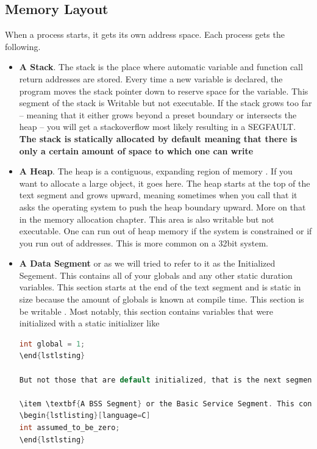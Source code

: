\subsection{Memory Layout}

When a process starts, it gets its own address space. Each process gets the following.

\begin{itemize}
\item \textbf{A Stack}.
The stack is the place where automatic variable and function call return addresses are stored.
Every time a new variable is declared, the program moves the stack pointer down to reserve space for the variable.
This segment of the stack is Writable but not executable.
If the stack grows too far -- meaning that it either grows beyond a preset boundary or intersects the heap -- you will get a stackoverflow most likely resulting in a SEGFAULT.
\textbf{The stack is statically allocated by default meaning that there is only a certain amount of space to which one can write}

\item \textbf{A Heap}.
The heap is a contiguous, expanding region of memory \cite{mallocinternals}.
If you want to allocate a large object, it goes here.
The heap starts at the top of the text segment and grows upward, meaning sometimes when you call  that it asks the operating system to push the heap boundary upward.
More on that in the memory allocation chapter.
This area is also writable but not executable.
One can run out of heap memory if the system is constrained or if you run out of addresses.
This is more common on a 32bit system.

\item \textbf{A Data Segment} or as we will tried to refer to it as the Initialized Segement. This contains all of your globals and any other static duration variables.
This section starts at the end of the text segment and is static in size because the amount of globals is known at compile time.
This section is be writable \cite[P. 124]{van1994expert}.
Most notably, this section contains variables that were initialized with a static initializer like

\begin{lstlisting}[language=C]
int global = 1;
\end{lstlsting}

But not those that are default initialized, that is the next segment.

\item \textbf{A BSS Segment} or the Basic Service Segment. This contains all of your globals and any other static duration variables that are implicitly zeroed out like.
\begin{lstlisting}[language=C]
int assumed_to_be_zero;
\end{lstlsting}


\end{lstlisting}
\end{itemize}
